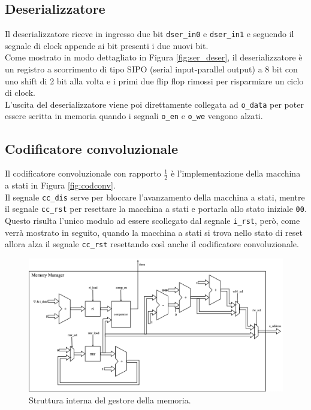 \documentclass[fleqn,11pt]{article}
\begin{document}
\subsection{Deserializzatore}
Il deserializzatore riceve in ingresso due bit \verb|dser_in0| e \verb|dser_in1| e seguendo il segnale di clock appende ai bit presenti i due nuovi bit.\\
Come mostrato in modo dettagliato in Figura \ref{fig:ser_deser}, il deserializzatore è un registro a scorrimento di tipo SIPO (serial input-parallel output) a 8 bit con uno shift di 2 bit alla volta e i primi due flip flop rimossi per risparmiare un ciclo di clock.\\
L'uscita del deserializzatore viene poi direttamente collegata ad \verb|o_data| per poter essere scritta in memoria quando i segnali \verb|o_en| e \verb|o_we| vengono alzati.

\subsection{Codificatore convoluzionale}
Il codificatore convoluzionale con rapporto \(\frac{1}{2}\) è l'implementazione della macchina a stati in Figura \ref{fig:codconv}.\\
Il segnale \verb|cc_dis| serve per bloccare l'avanzamento della macchina a stati, mentre il segnale \verb|cc_rst| per resettare la macchina a stati e portarla allo stato iniziale \verb|00|. Questo risulta l'unico modulo ad essere scollegato dal segnale \verb|i_rst|, però, come verrà mostrato in seguito, quando la macchina a stati si trova nello stato di reset allora alza il segnale \verb|cc_rst| resettando così anche il codificatore convoluzionale.

\begin{figure}[h]
    \centering
    \includegraphics[width=\textwidth]{mem_manager}
    \caption{Struttura interna del gestore della memoria.}
    \label{fig:mem_man}
\end{figure}
\end{document}
